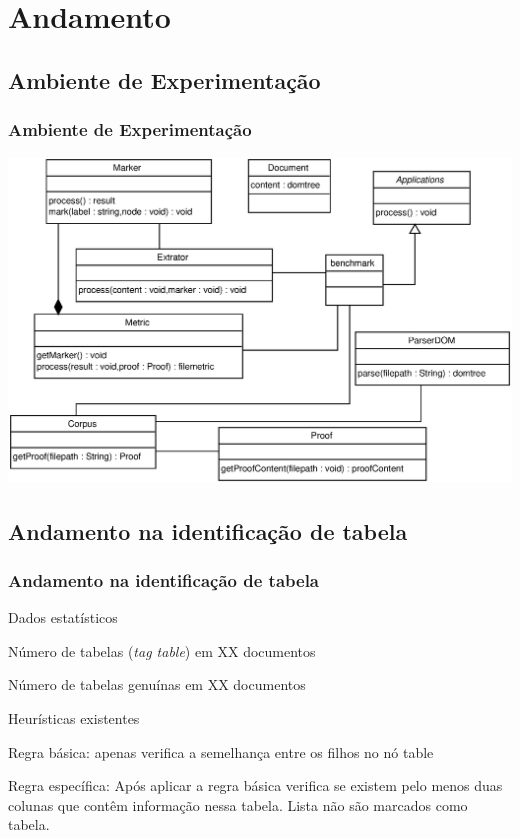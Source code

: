\documentclass{beamer}
\newenvironment{my_itemize}{
\begin{itemize}
  \setlength{\itemsep}{5pt}
  \setlength{\parskip}{2pt}
  \setlength{\parsep}{3pt}
}{\end{itemize}}
\begin{document}
\section{Andamento}
\begin{frame}
  \subsection{Ambiente de Experimentação}
  \frametitle{Ambiente de Experimentação}
\begin{center}
  \includegraphics[width=1\textwidth]{img/classes}
\end{center}
\end{frame}

\begin{frame}
  \subsection{Andamento na identificação de tabela}
  \frametitle{Andamento na identificação de tabela}
  \begin{my_itemize}
   \item Dados estatísticos
   \begin{my_itemize}
   \item Número de tabelas (\textit{tag table}) em {\color{yellow}XX} documentos
   \item Número de tabelas genuínas em {\color{yellow}XX} documentos
   \end{my_itemize}
  
   \item Heurísticas existentes
   \begin{my_itemize}
   \item Regra básica: apenas verifica a semelhança entre os filhos no nó table
   \item Regra específica: Após aplicar a regra básica verifica se existem pelo menos duas colunas que contêm informação nessa tabela. Lista não são marcados como tabela.
   \end{my_itemize}
  \end{my_itemize}
\end{frame}
\end{document}

